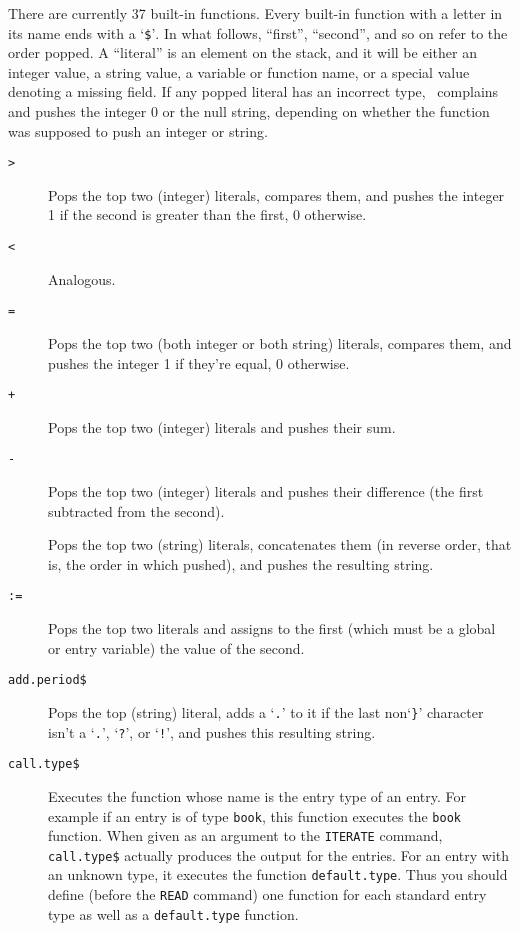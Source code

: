 There are currently 37 built-in functions.
Every built-in function with a letter in its name ends with a `{\tt \$}'$\!$.
In what follows, ``first''$\!$, ``second''$\!$,
and so on refer to the order popped.
A ``literal'' is an element on the stack, and it will be either
an integer value, a string value, a variable or function name,
or a special value denoting a missing field.
If any popped literal has an incorrect type, \BibTeX\ complains and pushes
the integer 0 or the null string, depending on whether the function
was supposed to push an integer or string.
\begin{description}

\item[\hbox{\tt >}\hfill]
Pops the top two (integer) literals,
compares them, and pushes the integer 1 if the second is greater than
the first, 0 otherwise.

\item[\hbox{\tt <}\hfill]
Analogous.

\item[\hbox{\tt =}\hfill]
Pops the top two (both integer or both string) literals,
compares them,
and pushes the integer 1 if they're equal, 0 otherwise.

\item[\hbox{\tt +}\hfill]
Pops the top two (integer) literals and pushes their sum.

\item[\hbox{\tt -}\hfill]
Pops the top two (integer) literals and pushes their difference
(the first subtracted from the second).

\item[\hbox{\tt *}\hfill]
Pops the top two (string) literals,
concatenates them (in reverse order, that is, the order in which
pushed), and pushes the resulting string.

\item[\hbox{\tt :=}\hfill]
Pops the top two literals and assigns
to the first (which must be a global or entry variable)
the value of the second.

\item[\hbox{\tt add.period\$}\hfill]
Pops the top (string) literal,
adds a `{\tt .}' to it if the last non`{\tt \}}' character
isn't a `{\tt .}'$\!$, `{\tt ?}', or `{\tt !}'$\!$,
and pushes this resulting string.

\item[\hbox{\tt call.type\$}\hfill]
Executes the function whose name is the entry type of an entry.
For example if an entry is of type {\tt book}, this function executes
the {\tt book} function.
When given as an argument to the \hbox{\tt ITERATE} command,
\hbox{\tt call.type\$} actually produces the output for the entries.
For an entry with an unknown type,
it executes the function \hbox{\tt default.type}.
Thus you should define (before the \hbox{\tt READ} command) one function
for each standard entry type as well as a \hbox{\tt default.type} function.


\end{description}
